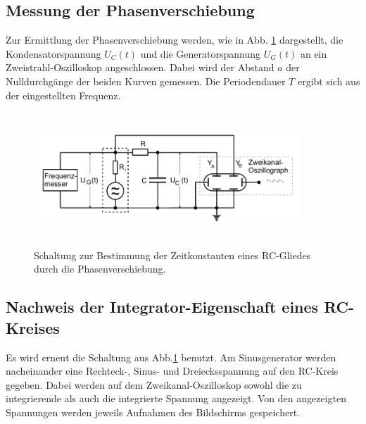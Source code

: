\subsection{Messung der Phasenverschiebung}
Zur Ermittlung der Phasenverschiebung werden, wie in Abb. \ref{fig:4c} dargestellt, die Kondensatorspannung $U_{C}(t)$ 
und die Generatorspannung $U_{G}(t)$ an ein Zweistrahl-Oszilloskop angeschlossen. Dabei wird der Abstand $a$ der 
Nulldurchgänge der beiden Kurven gemessen. Die Periodendauer $T$ ergibt sich aus der eingestellten Frequenz.%
\begin{figure}
  \centering
  \includegraphics[width= 10cm, height=5cm]{build/4c.png}
  \caption{Schaltung zur Bestimmung der Zeitkonstanten eines RC-Gliedes durch die Phasenverschiebung.\cite{versuch}}
  \label{fig:4c}
\end{figure}

\subsection{Nachweis der Integrator-Eigenschaft eines RC-Kreises}
Es wird erneut die Schaltung aus Abb.\ref{fig:4c} benutzt. Am Sinusgenerator werden nacheinander eine Rechteck-, 
Sinus- und Dreiecksspannung auf den RC-Kreis gegeben. Dabei werden auf dem Zweikanal-Oszilloskop sowohl die 
zu integrierende als auch die integrierte Spannung angezeigt. Von den angezeigten Spannungen werden jeweils Aufnahmen
des Bildschirms gespeichert. 
